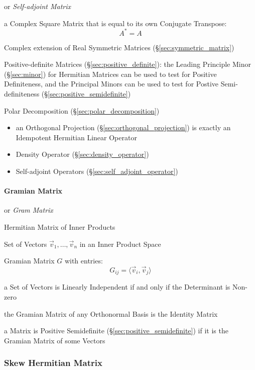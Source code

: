 or \emph{Self-adjoint Matrix}

a Complex Square Matrix that is equal to its own Conjugate Transpose:
\[
  A^* = A
\]

Complex extension of Real Symmetric Matrices (\S\ref{sec:symmetric_matrix})

Positive-definite Matrices (\S\ref{sec:positive_definite}): the Leading
Principle Minor (\S\ref{sec:minor}) for Hermitian Matrices can be used to test
for Positive Definiteness, and the Principal Minors can be used to test for
Postive Semi-definiteness (\S\ref{sec:positive_semidefinite})

Polar Decomposition (\S\ref{sec:polar_decomposition})

\begin{itemize}
\item an Orthogonal Projection (\S\ref{sec:orthogonal_projection}) is exactly an
  Idempotent Hermitian Linear Operator
\item Density Operator (\S\ref{sec:density_operator})
\item Self-adjoint Operators (\S\ref{sec:self_adjoint_operator})
\end{itemize}



\paragraph{Gramian Matrix}\label{sec:gramian_matrix}\hfill

or \emph{Gram Matrix}

Hermitian Matrix of Inner Products

Set of Vectors $\vec{v}_1,\ldots,\vec{v}_n$ in an Inner Product Space

Gramian Matrix $G$ with entries:
\[
  G_{ij} = \langle{\vec{v}_i,\vec{v}_j}\rangle
\]

a Set of Vectors is Linearly Independent if and only if the Determinant is
Non-zero

the Gramian Matrix of any Orthonormal Basis is the Identity Matrix

a Matrix is Positive Semidefinite (\S\ref{sec:positive_semidefinite}) if it is
the Gramian Matrix of some Vectors



\subsubsection{Skew Hermitian Matrix}\label{sec:skew_hermitian}

